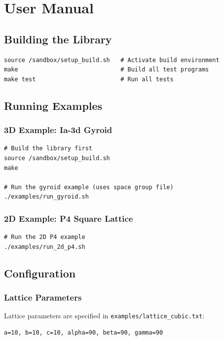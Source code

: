 \chapter{User Manual}

\section{Building the Library}

\begin{verbatim}
source /sandbox/setup_build.sh   # Activate build environment
make                             # Build all test programs
make test                        # Run all tests
\end{verbatim}

\section{Running Examples}

\subsection{3D Example: Ia-3d Gyroid}

\begin{verbatim}
# Build the library first
source /sandbox/setup_build.sh
make

# Run the gyroid example (uses space group file)
./examples/run_gyroid.sh
\end{verbatim}

\subsection{2D Example: P4 Square Lattice}

\begin{verbatim}
# Run the 2D P4 example
./examples/run_2d_p4.sh
\end{verbatim}

\section{Configuration}

\subsection{Lattice Parameters}

Lattice parameters are specified in \texttt{examples/lattice\_cubic.txt}:

\begin{verbatim}
a=10, b=10, c=10, alpha=90, beta=90, gamma=90
\end{verbatim}

